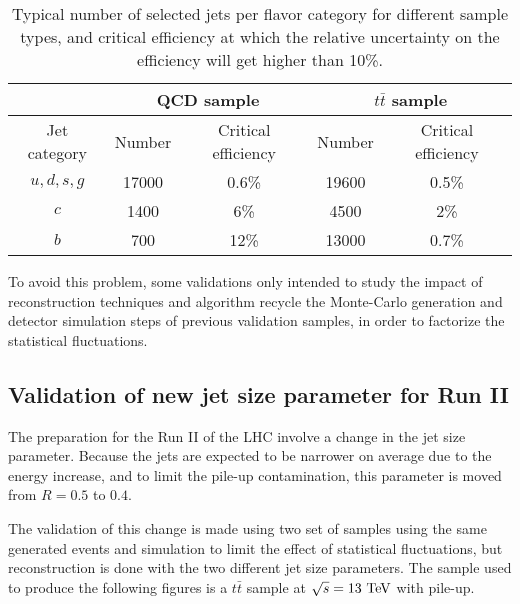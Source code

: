     \begin{table}
    \centering
    \begin{tabular}{c|cc|cc}
        \hline
                         & \multicolumn{2}{c}{QCD sample} & \multicolumn{2}{c}{$t\bar{t}$ sample} \\
        \hline
           Jet category  & Number & Critical efficiency   & Number & Critical efficiency \\
        \hline
            $u,d,s,g$    & 17000  & 0.6\%                 & 19600  & 0.5\% \\
            $c$          & 1400   & 6\%                   & 4500   & 2\%   \\
            $b$          & 700    & 12\%                  & 13000  & 0.7\% \\
        \hline
    \end{tabular}
        \caption{Typical number of selected jets per flavor category for different sample types,
        and critical efficiency at which the relative uncertainty on the efficiency will
        get higher than 10\%. \label{tab:criticalEfficiencyBTag}}
    \end{table}

    To avoid this problem, some validations only intended to study the impact of reconstruction
    techniques and algorithm recycle the Monte-Carlo generation and detector simulation
    steps of previous validation samples, in order to factorize the statistical fluctuations.

        \subsection{Validation of new jet size parameter for Run II}

        The preparation for the Run II of the LHC involve a change in the jet size parameter.
        Because the jets are expected to be narrower on average due to the energy increase,
        and to limit the pile-up contamination, this parameter is moved from $R = 0.5$ to $0.4$.

        The validation of this change is made using two set of samples using the same
        generated events and simulation to limit the effect of statistical fluctuations,
        but reconstruction is done with the two different jet size parameters. The sample
        used to produce the following figures is a $t\bar{t}$ sample at $\sqrt{s} = 13~\text{TeV}$
        with pile-up.


